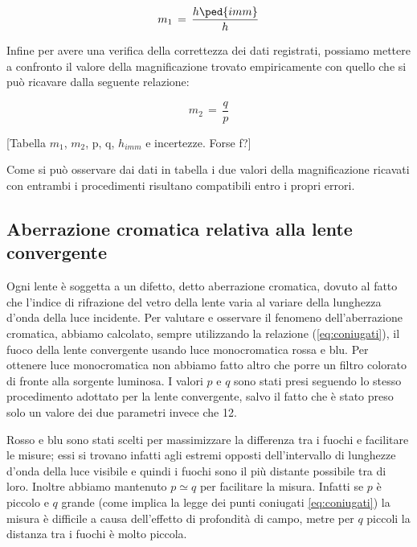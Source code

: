 \begin{equation}
	m_{1} \,=\, \frac{h \ped{imm}}{h}
\end{equation}

Infine per avere una verifica della correttezza dei dati registrati, possiamo mettere a confronto il valore della magnificazione trovato empiricamente con quello che si può ricavare dalla seguente relazione:

\begin{equation}
	m_{2} \,=\, \frac{q}{p}
\end{equation}

[Tabella $m_1$, $m_2$, p, q, $h_{imm}$ e incertezze. Forse f?]

Come si può osservare dai dati in tabella i due valori della magnificazione ricavati con entrambi i procedimenti risultano compatibili entro i propri errori. 

\subsection{Aberrazione cromatica relativa alla lente convergente}

Ogni lente è soggetta a un difetto, detto aberrazione cromatica, dovuto al fatto che l'indice di rifrazione del vetro della lente varia al variare della lunghezza d'onda della luce incidente.
Per valutare e osservare il fenomeno dell'aberrazione cromatica, abbiamo calcolato, sempre utilizzando la relazione (\ref{eq:coniugati}), il fuoco della lente convergente usando luce monocromatica rossa e blu. Per ottenere luce monocromatica non abbiamo fatto altro che porre un filtro colorato di fronte alla sorgente luminosa. I valori $p$ e $q$ sono stati presi seguendo lo stesso procedimento adottato per la lente convergente, salvo il fatto che è stato preso solo un valore dei due parametri invece che 12.

Rosso e blu sono stati scelti per massimizzare la differenza tra i fuochi e facilitare le misure; essi si trovano infatti agli estremi opposti dell'intervallo di lunghezze d'onda della luce visibile e quindi i fuochi sono il più distante possibile tra di loro. Inoltre abbiamo mantenuto $p \simeq q$ per facilitare la misura. Infatti se $p$ è piccolo e $q$ grande (come implica la legge dei punti coniugati \ref{eq:coniugati}) la misura è difficile a causa dell'effetto di profondità di campo, metre per $q$ piccoli la distanza tra i fuochi è molto piccola.

